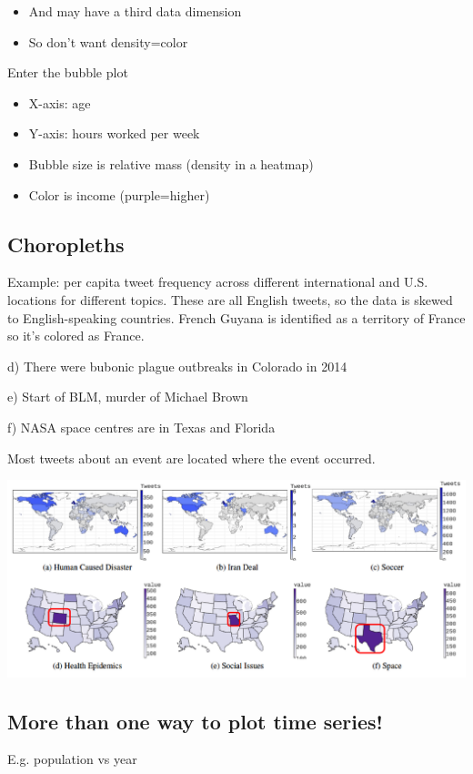 \documentclass[11pt]{article}
\theoremstyle{definition}
\begin{document}
\begin{itemize}
  \item And may have a third data
  dimension
  \item So don’t want density=color
\end{itemize}

Enter the bubble plot
\begin{itemize}
  \item X-axis: age
  \item Y-axis: hours worked per week
  \item Bubble size is relative mass
  (density in a heatmap)
  \item Color is income (purple=higher)
\end{itemize}
\subsection{Choropleths}
Example: per capita tweet frequency across different
international and U.S. locations for different topics. 
These are all English tweets, so the data is skewed to English-speaking countries.
French Guyana is identified as a territory of France so it's colored as France.

d) There were bubonic plague outbreaks in Colorado in 2014

e) Start of BLM, murder of Michael Brown

f) NASA space centres are in Texas and Florida

Most tweets about an event are located where the event occurred.

\includegraphics[width=\textwidth]{29.png}

\subsection{More than one way to plot time series!}

E.g. population vs year
\end{document}
